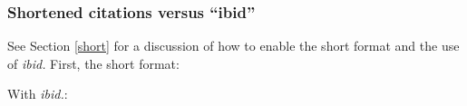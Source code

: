 \documentclass[11pt,letterpaper,oneside]{article}
\begin{document}
\begin{citebib}
\item \cite[24--25]{morley1995}
\item \cite{schwartz1992}
\item \cite{kaiser1964}
\item \cite[43]{morley1995}
\item \cite[138]{schwartz1992}
\item \cite[189--90]{kaiser1964}
\end{citebib}

\setcounter{subsubsection}{33}
\subsubsection{Shortened citations versus ``ibid''}
\label{14.34}

See Section \ref{short} for a discussion of how to enable the short
format and the use of \textit{ibid.} First, the short format:

\begin{citeonly}
\item \cite[3]{morrison2004a}
\item \cite[18]{morrison2004a}
\item \cite[18]{morrison2004a}
\item \cite[24--26]{morrison2004a}
\item \cite[401-2]{morrison2004b}
\item \cite[433]{morrison2004b}
\item \cite[37--38]{diaz2008}
\item \cite[403]{morrison2004b}
\item \cite[152]{diaz2008}
\item \cite[201-2]{diaz2008}
\item \cites[240]{morrison2004b}[32]{morrison2004a}
 \item \cite[33]{morrison2004a}
\end{citeonly}

\noindent With \textit{ibid.}:
\end{document}
